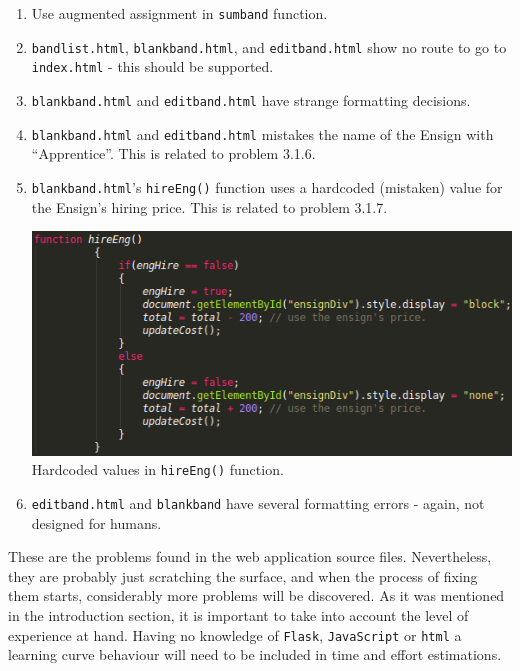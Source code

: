 \documentclass[12pt,a4paper]{article}
\begin{document}
\begin{enumerate}
 \item Use augmented assignment in \texttt{sumband} function.
 \item \texttt{bandlist.html}, \texttt{blankband.html}, and \texttt{editband.html} show no route to go to \texttt{index.html} - this should be supported.
 \item \texttt{blankband.html} and \texttt{editband.html} have strange formatting decisions.
 \item \texttt{blankband.html} and \texttt{editband.html} mistakes the name of the Ensign with ``Apprentice''. This is related to problem 3.1.6.
 \item \texttt{blankband.html}'s \texttt{hireEng()} function uses a hardcoded (mistaken) value for the Ensign's hiring price. This is related to problem 3.1.7.\\
 \begin{minipage}[t]{\linewidth}
 \centering
 \includegraphics[width=1\textwidth]{img/hireEng}
 Hardcoded values in \texttt{hireEng()} function.
 \end{minipage}
 
 \item \texttt{editband.html} and \texttt{blankband} have several formatting errors - again, not designed for humans.
\end{enumerate}

These are the problems found in the web application source files. Nevertheless, they are probably just scratching the surface, and when the process of fixing them starts, considerably more problems will be discovered. As it was mentioned in the introduction section, it is important to take into account the level of experience at hand. Having no knowledge of \texttt{Flask}, \texttt{JavaScript} or \texttt{html} a learning curve behaviour will need to be included in time and effort estimations. 
\end{document}
